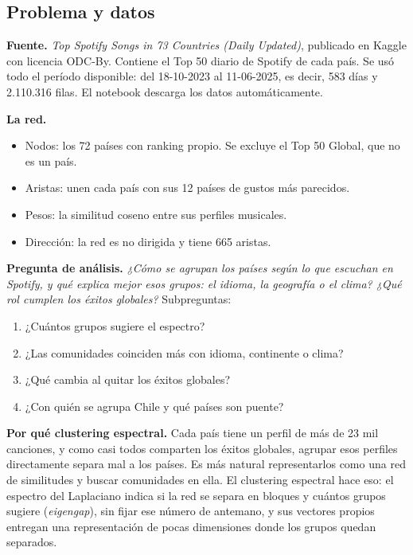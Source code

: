 \documentclass[11pt,a4paper]{article}
\begin{document}
\subsection{Problema y datos}

\textbf{Fuente.} \emph{Top Spotify Songs in 73 Countries (Daily Updated)}, publicado en Kaggle con licencia ODC-By. Contiene el Top 50 diario de Spotify de cada país. Se usó todo el período disponible: del 18-10-2023 al 11-06-2025, es decir, 583 días y 2.110.316 filas. El notebook descarga los datos automáticamente.

\textbf{La red.}
\begin{itemize}[leftmargin=1.5em]
\item Nodos: los 72 países con ranking propio. Se excluye el Top 50 Global, que no es un país.
\item Aristas: unen cada país con sus 12 países de gustos más parecidos.
\item Pesos: la similitud coseno entre sus perfiles musicales.
\item Dirección: la red es no dirigida y tiene 665 aristas.
\end{itemize}

\textbf{Pregunta de análisis.} \emph{¿Cómo se agrupan los países según lo que escuchan en Spotify, y qué explica mejor esos grupos: el idioma, la geografía o el clima? ¿Qué rol cumplen los éxitos globales?} Subpreguntas:
\begin{enumerate}[leftmargin=1.5em]
\item ¿Cuántos grupos sugiere el espectro?
\item ¿Las comunidades coinciden más con idioma, continente o clima?
\item ¿Qué cambia al quitar los éxitos globales?
\item ¿Con quién se agrupa Chile y qué países son puente?
\end{enumerate}

\textbf{Por qué clustering espectral.} Cada país tiene un perfil de más de 23 mil canciones, y como casi todos comparten los éxitos globales, agrupar esos perfiles directamente separa mal a los países. Es más natural representarlos como una red de similitudes y buscar comunidades en ella. El clustering espectral hace eso: el espectro del Laplaciano indica si la red se separa en bloques y cuántos grupos sugiere (\emph{eigengap}), sin fijar ese número de antemano, y sus vectores propios entregan una representación de pocas dimensiones donde los grupos quedan separados.
\end{document}
